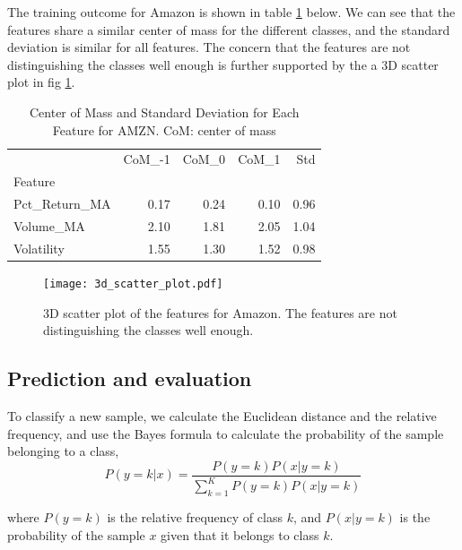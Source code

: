 \documentclass{article}
\begin{document}
The training outcome for Amazon is shown in table \ref{tab:com_std} below.
We can see that the features share a similar center of mass for the different classes,
and the standard deviation is similar for all features. The concern that the features
are not distinguishing the classes well enough is further supported by the
a 3D scatter plot in fig \ref{fig:3d_scatter_plot}.



\begin{table}
    \caption{Center of Mass and Standard Deviation for Each Feature for AMZN. CoM: center of mass}
    \label{tab:com_std}
    \begin{tabular}{lrrrr}
        \toprule
                        & CoM\_-1 & CoM\_0 & CoM\_1 & Std  \\
        Feature         &         &        &        &      \\
        \midrule
        Pct\_Return\_MA & 0.17    & 0.24   & 0.10   & 0.96 \\
        Volume\_MA      & 2.10    & 1.81   & 2.05   & 1.04 \\
        Volatility      & 1.55    & 1.30   & 1.52   & 0.98 \\
        \bottomrule
    \end{tabular}
\end{table}

\begin{figure}[ht]
    \centering
    \texttt{[image: 3d\_scatter\_plot.pdf]}
    \caption{3D scatter plot of the features for Amazon. The features are not
        distinguishing the classes well enough.}
    \label{fig:3d_scatter_plot}
\end{figure}

\subsection{Prediction and evaluation}
To classify a new sample, we calculate the Euclidean distance and the relative frequency,
and use the Bayes formula to calculate the probability of the sample belonging to
a class,
\[P\left( {y = k|x} \right) = \frac{{P\left( {y = k} \right)P\left( {x|y = k} \right)}}{{\sum\limits_{k = 1}^K {P\left( {y = k} \right)P\left( {x|y = k} \right)} }}\]

where $P(y=k)$ is the relative frequency of class $k$,
and $P(x|y=k)$ is the probability of the sample $x$ given that it belongs to class $k$.
\end{document}
